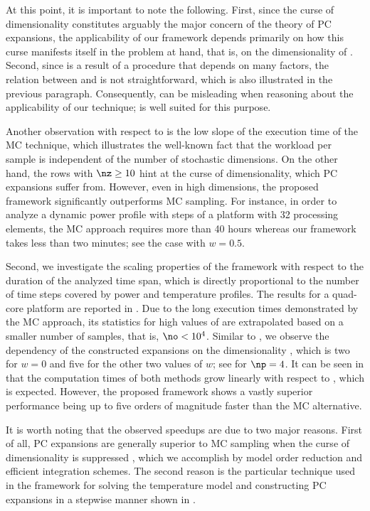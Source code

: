 At this point, it is important to note the following. First, since the curse of
dimensionality constitutes arguably the major concern of the theory of \ac{PC}
expansions, the applicability of our framework depends primarily on how this
curse manifests itself in the problem at hand, that is, on the dimensionality
\nz of \vz. Second, since \vz is a result of a procedure that depends on many
factors, the relation between \vu and \vz is not straightforward, which is also
illustrated in the previous paragraph. Consequently, \nu can be misleading when
reasoning about the applicability of our technique; \nz is well suited for this
purpose.

Another observation with respect to  is the
low slope of the execution time of the \ac{MC} technique, which illustrates the
well-known fact that the workload per sample is independent of the number of
stochastic dimensions. On the other hand, the rows with $\nz \geq 10$ hint at
the curse of dimensionality, which \ac{PC} expansions suffer from. However, even
in high dimensions, the proposed framework significantly outperforms \ac{MC}
sampling. For instance, in order to analyze a dynamic power profile with
 steps of a platform with 32 processing elements, the \ac{MC}
approach requires more than 40 hours whereas our framework takes less than two
minutes; see the case with $w = 0.5$.

Second, we investigate the scaling properties of the framework with respect to
the duration of the analyzed time span, which is directly proportional to the
number of time steps \ns covered by power and temperature profiles. The results
for a quad-core platform are reported in . Due
to the long execution times demonstrated by the \ac{MC} approach, its statistics
for high values of \ns are extrapolated based on a smaller number of samples,
that is, $\no < 10^4$. Similar to , we
observe the dependency of the constructed expansions on the dimensionality \nz,
which is two for $w = 0$ and five for the other two values of $w$; see
 for $\np = 4$. It can be seen in
 that the computation times of both methods
grow linearly with respect to \ns, which is expected. However, the proposed
framework shows a vastly superior performance being up to five orders of
magnitude faster than the \ac{MC} alternative.

It is worth noting that the observed speedups are due to two major reasons.
First of all, \ac{PC} expansions are generally superior to \ac{MC} sampling when
the curse of dimensionality is suppressed \cite{eldred2008, xiu2010}, which we
accomplish by model order reduction and efficient integration schemes. The
second reason is the particular technique used in the framework for solving the
temperature model and constructing \ac{PC} expansions in a stepwise manner shown
in .
